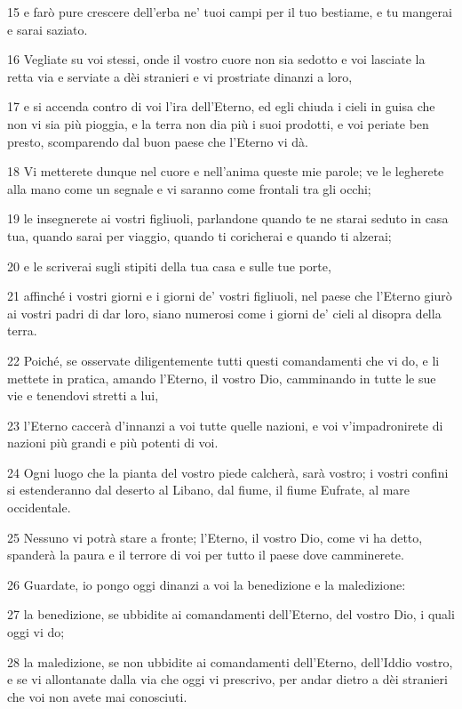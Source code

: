 \par 15 e farò pure crescere dell'erba ne' tuoi campi per il tuo bestiame, e tu mangerai e sarai saziato.
\par 16 Vegliate su voi stessi, onde il vostro cuore non sia sedotto e voi lasciate la retta via e serviate a dèi stranieri e vi prostriate dinanzi a loro,
\par 17 e si accenda contro di voi l'ira dell'Eterno, ed egli chiuda i cieli in guisa che non vi sia più pioggia, e la terra non dia più i suoi prodotti, e voi periate ben presto, scomparendo dal buon paese che l'Eterno vi dà.
\par 18 Vi metterete dunque nel cuore e nell'anima queste mie parole; ve le legherete alla mano come un segnale e vi saranno come frontali tra gli occhi;
\par 19 le insegnerete ai vostri figliuoli, parlandone quando te ne starai seduto in casa tua, quando sarai per viaggio, quando ti coricherai e quando ti alzerai;
\par 20 e le scriverai sugli stipiti della tua casa e sulle tue porte,
\par 21 affinché i vostri giorni e i giorni de' vostri figliuoli, nel paese che l'Eterno giurò ai vostri padri di dar loro, siano numerosi come i giorni de' cieli al disopra della terra.
\par 22 Poiché, se osservate diligentemente tutti questi comandamenti che vi do, e li mettete in pratica, amando l'Eterno, il vostro Dio, camminando in tutte le sue vie e tenendovi stretti a lui,
\par 23 l'Eterno caccerà d'innanzi a voi tutte quelle nazioni, e voi v'impadronirete di nazioni più grandi e più potenti di voi.
\par 24 Ogni luogo che la pianta del vostro piede calcherà, sarà vostro; i vostri confini si estenderanno dal deserto al Libano, dal fiume, il fiume Eufrate, al mare occidentale.
\par 25 Nessuno vi potrà stare a fronte; l'Eterno, il vostro Dio, come vi ha detto, spanderà la paura e il terrore di voi per tutto il paese dove camminerete.
\par 26 Guardate, io pongo oggi dinanzi a voi la benedizione e la maledizione:
\par 27 la benedizione, se ubbidite ai comandamenti dell'Eterno, del vostro Dio, i quali oggi vi do;
\par 28 la maledizione, se non ubbidite ai comandamenti dell'Eterno, dell'Iddio vostro, e se vi allontanate dalla via che oggi vi prescrivo, per andar dietro a dèi stranieri che voi non avete mai conosciuti.
